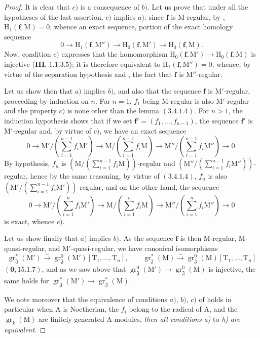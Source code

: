 \begin{proof}
It is clear that $c)$ is a consequence of $b)$. Let us prove that under all the hypotheses of the last assertion, $c)$ implies $a)$: since $\mathbf{f}$ is M-regular, by , $\mathrm{H}_1(\mathbf{f},\mathrm{M})=0$, whence an exact sequence, portion of the exact homology sequence
\[
  0\to\mathrm{H}_1(\mathbf{f},\mathrm{M}'')\to\mathrm{H}_0(\mathbf{f},\mathrm{M}')\to\mathrm{H}_0(\mathbf{f},\mathrm{M}).
\]
Now, condition $c)$ expresses that the homomorphism $\mathrm{H}_0(\mathbf{f},\mathrm{M}')\to\mathrm{H}_0(\mathbf{f},\mathrm{M})$ is injective (\textbf{III}, $1.1.3.5$); it is therefore equivalent to $\mathrm{H}_1(\mathbf{f},\mathrm{M}'')=0$, whence, by virtue of the separation hypothesis and , the fact that $\mathbf{f}$ is $\mathrm{M}''$-regular.

Let us show then that $a)$ implies $b)$, and also that the sequence $\mathbf{f}$ is $\mathrm{M}'$-regular, proceeding by induction on $n$. For $n=1$, $f_1$ being M-regular is also $\mathrm{M}'$-regular and the property $c)$ is none other than the lemma $(3.4.1.4)$. For $n>1$, the induction hypothesis shows that
if we set $\mathbf{f}'=(f_1,\ldots,f_{n-1})$, the sequence $\mathbf{f}'$ is $\mathrm{M}'$-regular and, by virtue of $c)$, we have an exact sequence
\[
  0\to\mathrm{M}'/(\textstyle\sum_{i=1}^{n-1}f_i\mathrm{M}')\to\mathrm{M}/(\textstyle\sum_{i=1}^{n-1}f_i\mathrm{M})\to\mathrm{M}''/(\textstyle\sum_{i=1}^{n-1}f_i\mathrm{M}'')\to 0.
\]
By hypothesis, $f_n$ is $(\mathrm{M}/(\sum_{i=1}^{n-1}f_i\mathrm{M}))$-regular and $(\mathrm{M}''/(\sum_{i=1}^{n-1}f_i\mathrm{M}''))$-regular, hence by the same reasoning, by virtue of $(3.4.1.4)$, $f_n$ is also $(\mathrm{M}'/(\sum_{i=1}^{n-1}f_i\mathrm{M}'))$-regular, and on the other hand, the sequence
\[
  0\to\mathrm{M}'/(\textstyle\sum_{i=1}^{n}f_i\mathrm{M}')\to\mathrm{M}/(\textstyle\sum_{i=1}^{n}f_i\mathrm{M})\to\mathrm{M}''/(\textstyle\sum_{i=1}^{n}f_i\mathrm{M}'')\to 0
\]
is exact, whence $c)$.

Let us show finally that $a)$ implies $b)$. As the sequence $\mathbf{f}$ is then M-regular, M-quasi-regular, and $\mathrm{M}'$-quasi-regular, we have canonical isomorphisms
\[
  \operatorname{gr}_\mathfrak{J}^*(\mathrm{M}')\xrightarrow{\sim}\operatorname{gr}_\mathfrak{J}^0(\mathrm{M}')[\mathrm{T}_1,\ldots,\mathrm{T}_n],\qquad
  \operatorname{gr}_\mathfrak{J}^*(\mathrm{M})\xrightarrow{\sim}\operatorname{gr}_\mathfrak{J}^0(\mathrm{M})[\mathrm{T}_1,\ldots,\mathrm{T}_n]
\]
$(\mathbf{0},15.1.7)$, and as we saw above that $\operatorname{gr}_\mathfrak{J}^0(\mathrm{M}')\to\operatorname{gr}_\mathfrak{J}^0(\mathrm{M})$ is injective, the same holds for $\operatorname{gr}_\mathfrak{J}^*(\mathrm{M}')\to\operatorname{gr}_\mathfrak{J}^*(\mathrm{M})$.

We note moreover that the equivalence of conditions $a)$, $b)$, $c)$ of  holds in particular when $\mathrm{A}$ is Noetherian, the $f_i$ belong to the radical of $\mathrm{A}$, and the $\operatorname{gr}_k(\mathrm{M})$ are finitely generated $\mathrm{A}$-modules, \emph{then all conditions} \emph{a)} to \emph{h)} \emph{are equivalent}.
\end{proof}

